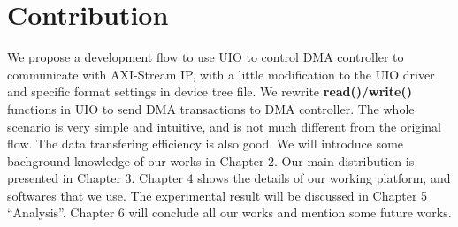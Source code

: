 



\section{Contribution}
\label{sec:contribution}
We propose a development flow to use UIO to control DMA controller to communicate with AXI-Stream IP, with a little modification to the UIO driver and specific format settings in device tree file. We rewrite \textbf{read()/write()} functions in UIO to send DMA transactions to DMA controller. The whole scenario is very simple and intuitive, and is not much different from the original flow. The data transfering efficiency is also good. We will introduce some bachground knowledge of our works in Chapter 2. Our main distribution is presented in Chapter 3. Chapter 4 shows the details of our working platform, and softwares that we use.  
The experimental result will be discussed in Chapter 5 ``Analysis''. Chapter 6 will conclude all our works and mention some future works.

